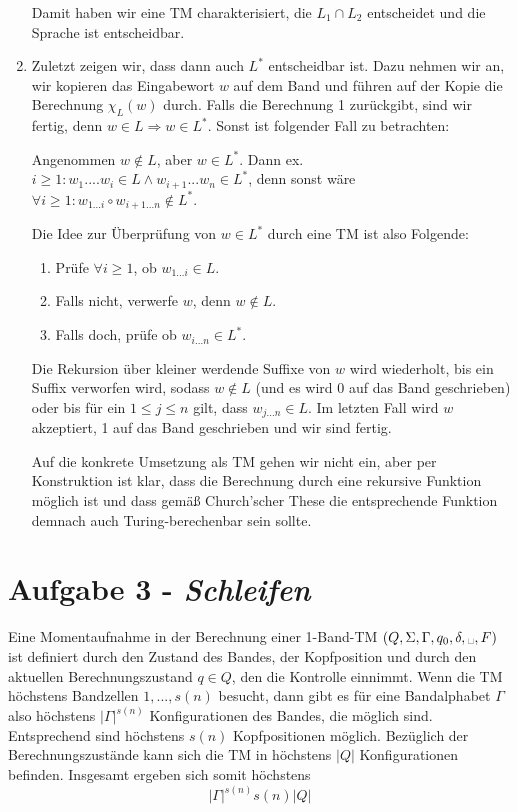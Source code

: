 \documentclass{article}
\begin{document}
\begin{enumerate}
	Damit haben wir eine TM charakterisiert, die $L_1 \cap L_2$ entscheidet und die Sprache ist entscheidbar.
	
	\item Zuletzt zeigen wir, dass dann auch $L^*$ entscheidbar ist. Dazu nehmen wir an, wir kopieren das Eingabewort $w$ auf dem Band und führen auf der Kopie die Berechnung $\chi_L(w)$ durch. Falls die Berechnung 1 zurückgibt, sind wir fertig, denn $w \in L \Rightarrow w\in L^*$. Sonst ist folgender Fall zu betrachten:
	
	Angenommen $w\not\in L$, aber $w \in L^*$. Dann ex. $i \ge 1: w_1 .... w_i \in L \land w_{i+1}... w_n \in L^*$, denn sonst wäre $ \forall i\ge 1 : w_{1...i} \circ w_{i+1...n} \not\in L^*$.
	
	Die Idee zur Überprüfung von $w \in L^*$ durch eine TM ist also Folgende:
	\begin{enumerate}
		\item Prüfe $\forall i\ge 1$, ob $w_{1...i} \in L$.
		\item Falls nicht, verwerfe $w$, denn $w \not \in L$.
		\item Falls doch, prüfe ob $w_{i...n} \in L^*$.
	\end{enumerate}
	
	Die Rekursion über kleiner werdende Suffixe von $w$ wird wiederholt, bis ein Suffix verworfen wird, sodass $w\not\in L$ (und es wird 0 auf das Band geschrieben) oder bis für ein $1 \le j \le n$ gilt, dass $w_{j ... n} \in L$. Im letzten Fall wird $w$ akzeptiert, 1 auf das Band geschrieben und wir sind fertig.
	
	Auf die konkrete Umsetzung als TM gehen wir nicht ein, aber per Konstruktion ist klar, dass die Berechnung durch eine rekursive Funktion möglich ist und dass gemäß Church'scher These die entsprechende Funktion demnach auch Turing-berechenbar sein sollte.
	
\end{enumerate}

\section*{Aufgabe 3 - \textit{Schleifen}}

Eine Momentaufnahme in der Berechnung einer 1-Band-TM $(Q,\Sigma,\Gamma,q_0,\delta,\text{\textvisiblespace},F)$ ist definiert durch den Zustand des Bandes, der Kopfposition und durch den aktuellen Berechnungszustand $q \in Q$, den die Kontrolle einnimmt. Wenn die TM höchstens Bandzellen $1,...,s(n)$ besucht, dann gibt es für eine Bandalphabet $\Gamma$ also höchstens $|\Gamma|^{s(n)}$ Konfigurationen des Bandes, die möglich sind. Entsprechend sind höchstens $s(n)$ Kopfpositionen möglich. Bezüglich der Berechnungszustände kann sich die TM in höchstens $|Q|$ Konfigurationen befinden. Insgesamt ergeben sich somit höchstens
\begin{equation}
	|\Gamma|^{s(n)} s(n) |Q|
\end{equation}
\end{document}
